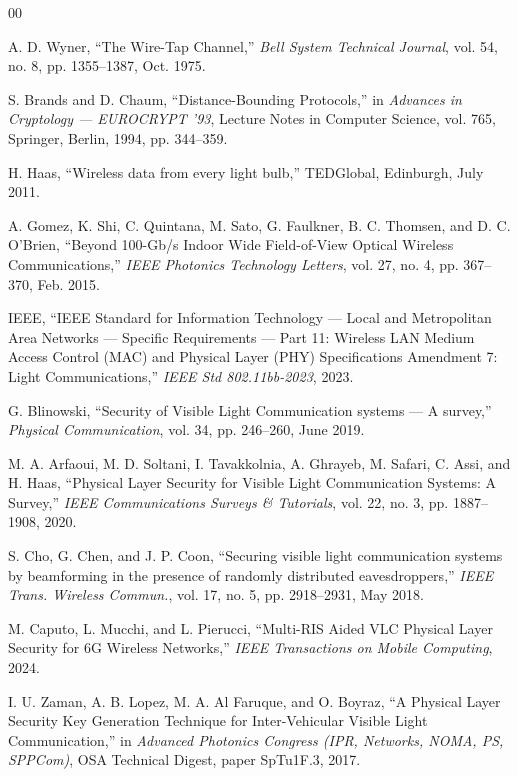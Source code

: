 \documentclass[conference]{IEEEtran}
\begin{document}
\begin{thebibliography}{00}

A. D. Wyner, ``The Wire-Tap Channel,'' \textit{Bell System Technical Journal}, vol. 54, no. 8, pp. 1355--1387, Oct. 1975.

S. Brands and D. Chaum, ``Distance-Bounding Protocols,'' in \textit{Advances in Cryptology --- EUROCRYPT '93}, Lecture Notes in Computer Science, vol. 765, Springer, Berlin, 1994, pp. 344--359.

H. Haas, ``Wireless data from every light bulb,'' TEDGlobal, Edinburgh, July 2011.

A. Gomez, K. Shi, C. Quintana, M. Sato, G. Faulkner, B. C. Thomsen, and D. C. O'Brien, ``Beyond 100-Gb/s Indoor Wide Field-of-View Optical Wireless Communications,'' \textit{IEEE Photonics Technology Letters}, vol. 27, no. 4, pp. 367--370, Feb. 2015.

IEEE, ``IEEE Standard for Information Technology --- Local and Metropolitan Area Networks --- Specific Requirements --- Part 11: Wireless LAN Medium Access Control (MAC) and Physical Layer (PHY) Specifications Amendment 7: Light Communications,'' \textit{IEEE Std 802.11bb-2023}, 2023.

G. Blinowski, ``Security of Visible Light Communication systems --- A survey,'' \textit{Physical Communication}, vol. 34, pp. 246--260, June 2019.

M. A. Arfaoui, M. D. Soltani, I. Tavakkolnia, A. Ghrayeb, M. Safari, C. Assi, and H. Haas, ``Physical Layer Security for Visible Light Communication Systems: A Survey,'' \textit{IEEE Communications Surveys \& Tutorials}, vol. 22, no. 3, pp. 1887--1908, 2020.

S. Cho, G. Chen, and J. P. Coon, ``Securing visible light communication systems by beamforming in the presence of randomly distributed eavesdroppers,'' \textit{IEEE Trans. Wireless Commun.}, vol. 17, no. 5, pp. 2918--2931, May 2018.

M. Caputo, L. Mucchi, and L. Pierucci, ``Multi-RIS Aided VLC Physical Layer Security for 6G Wireless Networks,'' \textit{IEEE Transactions on Mobile Computing}, 2024.

I. U. Zaman, A. B. Lopez, M. A. Al Faruque, and O. Boyraz, ``A Physical Layer Security Key Generation Technique for Inter-Vehicular Visible Light Communication,'' in \textit{Advanced Photonics Congress (IPR, Networks, NOMA, PS, SPPCom)}, OSA Technical Digest, paper SpTu1F.3, 2017.


\end{thebibliography}
\end{document}

